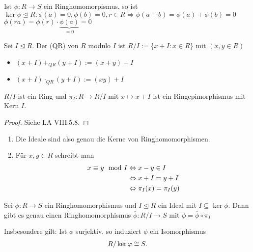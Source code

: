 \begin{example}
	Ist $\phi: R \to S$ ein Ringhomomorpismus, so ist $\ker \phi \unlhd R : \phi(a) = 0, \phi(b) = 0, r \in R \Rightarrow \phi(a+b) = \phi(a) + \phi(b) = 0$\\
	$\phi(ra) = \phi(r)\cdot \underbrace{\phi(a)}_{=0} = 0$
\end{example}

\begin{definition}[Quotientenring] 
	Sei $I \unlhd R$. Der  (QR) von $R$ modulo $I$ ist $R/I := \{x + I \colon x \in R\}$
	mit $(x, y \in R)$
	\begin{itemize}
		\item $(x+ I) +_{QR} (y+I) := (x+y) +I$
		\item $(x+I) \cdot_{QR} (y+I) := (xy) +I$
	\end{itemize}
\end{definition}

\begin{proposition}
	$R/I$ ist ein Ring und $\pi_I : R \to R/I$ mit $x \mapsto x +I$ ist ein Ringepimorphismus mit Kern $I$.
\end{proposition}

\begin{proof}
	Siehe LA VIII.5.8.
\end{proof}

\begin{remark}
	\begin{enumerate}
		\item Die Ideale sind also genau die Kerne von Ringhomomorphismen.
		\item Für $x,y \in R$ schreibt man
		\begin{align}
			x \equiv y \mod I &\Leftrightarrow x - y \in I\notag \\
			&\Leftrightarrow x+I = y+I\notag \\
			&\Leftrightarrow \pi_I(x) = \pi_I(y) \notag
		\end{align}
	\end{enumerate}
\end{remark}

\begin{proposition}[Homomorphiesatz]
	Sei $\phi: R \to S$ ein Ringhomomorphismus und $I \unlhd R$ ein Ideal mit $I \subseteq \ker \phi$. Dann gibt es genau einen Ringhomomorphismus $\overline{\phi}:R/I \to S$ mit $\phi = \overline{\phi}\circ \pi_I$
		\begin{center}
	\end{center}
	Insbesondere gilt: Ist $\phi$ surjektiv, so induziert $\phi$ ein Isomorphismus
	\begin{align}
		R / \ker \phi \cong S. \notag
	\end{align}
\end{proposition}

